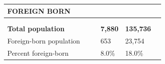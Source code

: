 \documentclass[9pt]{report}
\begin{document}
\newpage
\setlength{\tabcolsep}{.01in} %
\begin{tabular}{p{.10in}p{.10in}p{.10in}p{3.7in}>{\hfill}p{.85in}>{\hfill}p{.85in}>{\hfill}p{.85in}>{\hfill}p{.85in}p{0.1in}}
\multicolumn{9}{l}{\parbox{7.1in}{\raggedright{\large{\strut\textbf{FOREIGN BORN}\strut}}}} \\ 
\hline
\multicolumn{4}{l}{\parbox{3.5in}{\raggedright{\textbf{}}}} & \multicolumn{1}{r}{\parbox{.85in}{\strut\raggedleft{\textbf{}\strut}}} & \multicolumn{1}{r}{\parbox{.85in}{\strut\raggedleft{\textbf{}\strut}}} & \multicolumn{1}{r}{\parbox{.85in}{\strut{}}} & \multicolumn{1}{r}{\parbox{.85in}{\strut{}}} & \\ 
\multicolumn{9}{l}{} \\ 
\multicolumn{4}{l}{\parbox{3.5in}{\strut\raggedright{\textbf{Total population}\strut}}} & \textbf{} & \textbf{} & \textbf{7,880} & \textbf{135,736} & \textbf{} \\ 
\multicolumn{4}{l}{\parbox{3.6in}{\strut\raggedright{{Foreign-born population}}\strut}} &  &  & 653 & 23,754 & \multicolumn{1}{l}{}  \\ 
\multicolumn{4}{l}{\parbox{3.6in}{\strut\raggedright{{Percent foreign-born}}\strut}} &  &  & 8.0\% & 18.0\% & \multicolumn{1}{l}{}  \\ 

\end{tabular}
\setlength{\tabcolsep}{6pt} %
\end{document}
